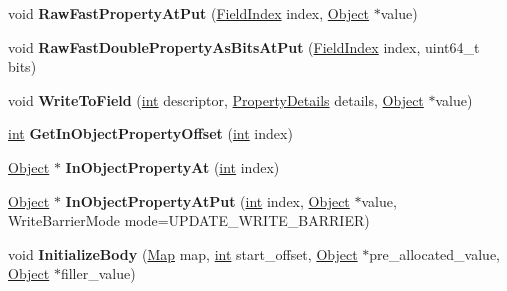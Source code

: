 \begin{DoxyCompactItemize}
void {\bfseries Raw\+Fast\+Property\+At\+Put} (\mbox{\hyperlink{classv8_1_1internal_1_1FieldIndex}{Field\+Index}} index, \mbox{\hyperlink{classv8_1_1internal_1_1Object}{Object}} $\ast$value)
\item 
\mbox{\label{classv8_1_1internal_1_1JSObject_afb4ed7317e2a278fb9f9c7addb57e3e1}} 
void {\bfseries Raw\+Fast\+Double\+Property\+As\+Bits\+At\+Put} (\mbox{\hyperlink{classv8_1_1internal_1_1FieldIndex}{Field\+Index}} index, uint64\+\_\+t bits)
\item 
\mbox{\label{classv8_1_1internal_1_1JSObject_a4db954302ef8fe567e8106eecb41b0d7}} 
void {\bfseries Write\+To\+Field} (\mbox{\hyperlink{classint}{int}} descriptor, \mbox{\hyperlink{classv8_1_1internal_1_1PropertyDetails}{Property\+Details}} details, \mbox{\hyperlink{classv8_1_1internal_1_1Object}{Object}} $\ast$value)
\item 
\mbox{\label{classv8_1_1internal_1_1JSObject_a4f8ffe19e26ca55d11efe84d24e08c13}} 
\mbox{\hyperlink{classint}{int}} {\bfseries Get\+In\+Object\+Property\+Offset} (\mbox{\hyperlink{classint}{int}} index)
\item 
\mbox{\label{classv8_1_1internal_1_1JSObject_a2780a1cf5386b77bd61264ea2831bbb1}} 
\mbox{\hyperlink{classv8_1_1internal_1_1Object}{Object}} $\ast$ {\bfseries In\+Object\+Property\+At} (\mbox{\hyperlink{classint}{int}} index)
\item 
\mbox{\label{classv8_1_1internal_1_1JSObject_a0b2a8eedcdcfd224ad0fb511381fbe4d}} 
\mbox{\hyperlink{classv8_1_1internal_1_1Object}{Object}} $\ast$ {\bfseries In\+Object\+Property\+At\+Put} (\mbox{\hyperlink{classint}{int}} index, \mbox{\hyperlink{classv8_1_1internal_1_1Object}{Object}} $\ast$value, Write\+Barrier\+Mode mode=U\+P\+D\+A\+T\+E\+\_\+\+W\+R\+I\+T\+E\+\_\+\+B\+A\+R\+R\+I\+ER)
\item 
\mbox{\label{classv8_1_1internal_1_1JSObject_abe3db529a763161c140e621276fdf45b}} 
void {\bfseries Initialize\+Body} (\mbox{\hyperlink{classv8_1_1internal_1_1Map}{Map}} map, \mbox{\hyperlink{classint}{int}} start\+\_\+offset, \mbox{\hyperlink{classv8_1_1internal_1_1Object}{Object}} $\ast$pre\+\_\+allocated\+\_\+value, \mbox{\hyperlink{classv8_1_1internal_1_1Object}{Object}} $\ast$filler\+\_\+value)

\end{DoxyCompactItemize}
